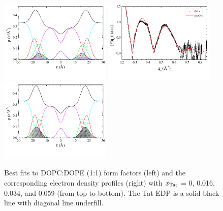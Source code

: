 \begin{figure}[htbp]
  \includegraphics[trim=5 30 0 0,clip=true,width=0.47\textwidth]{figures/Tat/SDP_Results/EDP/DOPCDOPE1to1_Tat_28to1_3p0_EDP1}
  \includegraphics[trim=5 30 0 0,clip=true,width=0.47\textwidth]{figures/Tat/SDP_Results/XFF/DOPCDOPE1to1_Tat_16to1_3p0_XFF1}
  \includegraphics[trim=5 30 0 0,clip=true,width=0.47\textwidth]{figures/Tat/SDP_Results/EDP/DOPCDOPE1to1_Tat_16to1_3p0_EDP1}
  \caption{Best fits to DOPC:DOPE (1:1) form factors (left) and the corresponding 
  electron density profiles (right) with $x_\textrm{Tat}$ = 0, 0.016, 0.034, 
  and 0.059 (from top to bottom).
  The Tat EDP is a solid black line with diagonal line underfill.}
  \label{fig:DOPCDOPE1to1_Tat_XFF1}
\end{figure}


